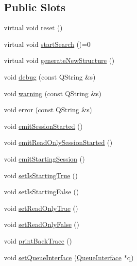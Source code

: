 \subsection*{Public Slots}
\begin{DoxyCompactItemize}
\item 
virtual void \hyperlink{classGlobalSearch_1_1OptBase_aeb13548fad4b090a7e570011292fd389}{reset} ()
\item 
virtual void \hyperlink{classGlobalSearch_1_1OptBase_adc0d183586cb9433edc941ccea4cd1a4}{start\-Search} ()=0
\item 
virtual void \hyperlink{classGlobalSearch_1_1OptBase_a24b6e929232e6b82551c3917bf7dcc1c}{generate\-New\-Structure} ()
\item 
void \hyperlink{classGlobalSearch_1_1OptBase_a3e24cda71c456027edbcab36c9a5e08c}{debug} (const Q\-String \&s)
\item 
void \hyperlink{classGlobalSearch_1_1OptBase_a4f70a04b72a92665b7fb6f8e868b527e}{warning} (const Q\-String \&s)
\item 
void \hyperlink{classGlobalSearch_1_1OptBase_a0069abbd35393e6a5760b049e3497a21}{error} (const Q\-String \&s)
\item 
void \hyperlink{classGlobalSearch_1_1OptBase_ae71d020ca740d76941b66c682eea6986}{emit\-Session\-Started} ()
\item 
void \hyperlink{classGlobalSearch_1_1OptBase_ae1bd90daf659e169a56622d47f6a5be2}{emit\-Read\-Only\-Session\-Started} ()
\item 
void \hyperlink{classGlobalSearch_1_1OptBase_abbcfe0cbb229deb3781b718d175c14c2}{emit\-Starting\-Session} ()
\item 
void \hyperlink{classGlobalSearch_1_1OptBase_aa26f280c771034e15a1579057f4b5735}{set\-Is\-Starting\-True} ()
\item 
void \hyperlink{classGlobalSearch_1_1OptBase_a539171ea69cf4cfe55c08262e4af40f8}{set\-Is\-Starting\-False} ()
\item 
void \hyperlink{classGlobalSearch_1_1OptBase_a8f8fa9427077b974cbfc897089e34115}{set\-Read\-Only\-True} ()
\item 
void \hyperlink{classGlobalSearch_1_1OptBase_a284697394517be5888968af5c7716f6a}{set\-Read\-Only\-False} ()
\item 
void \hyperlink{classGlobalSearch_1_1OptBase_af00d6357f3ed311e9bcd2b03153fc3cc}{print\-Back\-Trace} ()
\item 
void \hyperlink{classGlobalSearch_1_1OptBase_add9178a3bfd695f1d42191a328956451}{set\-Queue\-Interface} (\hyperlink{classGlobalSearch_1_1QueueInterface}{Queue\-Interface} $\ast$q)

\end{DoxyCompactItemize}
